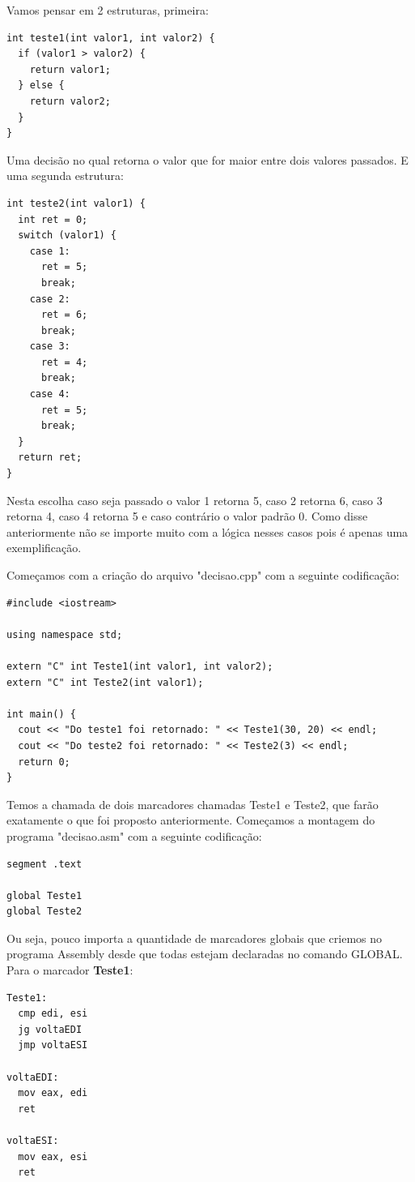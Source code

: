 Vamos pensar em 2 estruturas, primeira:
\begin{lstlisting}[]
int teste1(int valor1, int valor2) {
  if (valor1 > valor2) {
    return valor1;
  } else {
    return valor2;
  }
}
\end{lstlisting}

Uma decisão no qual retorna o valor que for maior entre dois valores passados. E uma segunda estrutura:
\begin{lstlisting}[]
int teste2(int valor1) {
  int ret = 0;
  switch (valor1) {
    case 1:
      ret = 5;
      break;
    case 2:
      ret = 6;
      break;
    case 3:
      ret = 4;
      break;
    case 4:
      ret = 5;
      break;
  }
  return ret;
}
\end{lstlisting}

Nesta escolha caso seja passado o valor 1 retorna 5, caso 2 retorna 6, caso 3 retorna 4, caso 4 retorna 5 e caso contrário o valor padrão 0. Como disse anteriormente não se importe muito com a lógica nesses casos pois é apenas uma exemplificação.

Começamos com a criação do arquivo "decisao.cpp" com a seguinte codificação:
\begin{lstlisting}[]
#include <iostream>

using namespace std;

extern "C" int Teste1(int valor1, int valor2);
extern "C" int Teste2(int valor1);

int main() {
  cout << "Do teste1 foi retornado: " << Teste1(30, 20) << endl;
  cout << "Do teste2 foi retornado: " << Teste2(3) << endl;
  return 0;
}
\end{lstlisting}

Temos a chamada de dois marcadores chamadas Teste1 e Teste2, que farão exatamente o que foi proposto anteriormente. Começamos a montagem do programa "decisao.asm" com a seguinte codificação:
\begin{lstlisting}[]
segment .text

global Teste1
global Teste2
\end{lstlisting}

Ou seja, pouco importa a quantidade de marcadores globais que criemos no programa Assembly desde que todas estejam declaradas no comando GLOBAL. Para o marcador \textbf{Teste1}:
\begin{lstlisting}[]
Teste1:
  cmp edi, esi
  jg voltaEDI
  jmp voltaESI

voltaEDI:
  mov eax, edi
  ret

voltaESI:
  mov eax, esi
  ret
\end{lstlisting}

